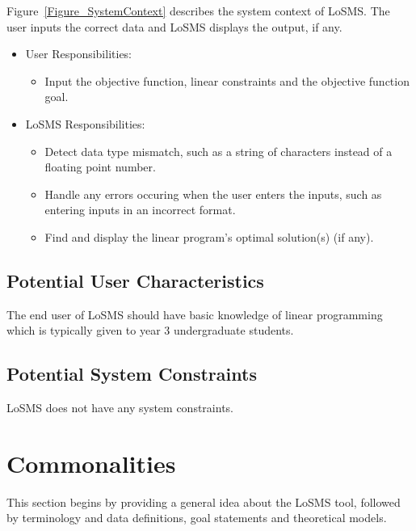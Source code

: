 \documentclass[12pt]{article}
\newcommand{\famname}{LoSMS} %
\begin{document}
Figure~\ref{Figure_SystemContext} describes the system context of \famname{}. 
The user inputs the correct data and \famname{} displays the output, if any.

\begin{itemize}
	\item User Responsibilities: 
	\begin{itemize}
		\item Input the objective function, linear constraints and the 
		objective function goal.
	\end{itemize}
	\item \famname{} Responsibilities:
	\begin{itemize}
		\item Detect data type mismatch, such as a string of characters instead 
		of a floating point number.
		
		\item Handle any errors occuring when the user enters the inputs, such 
		as entering inputs in an incorrect format.
		
		\item Find and display the linear program's optimal solution(s) (if 
		any).
	\end{itemize}
\end{itemize}

\subsection{Potential User Characteristics} \label{SecUserCharacteristics}

The end user of \famname{} should have basic knowledge of linear programming  
which is typically given to year 3 undergraduate students.

\subsection{Potential System Constraints}

\famname{} does not have any system constraints.

\section{Commonalities} \label{Sec_Commonalities}

This section begins by providing a general idea about the \famname{} tool, 
followed by terminology and data definitions, goal statements and theoretical 
models.
\end{document}
